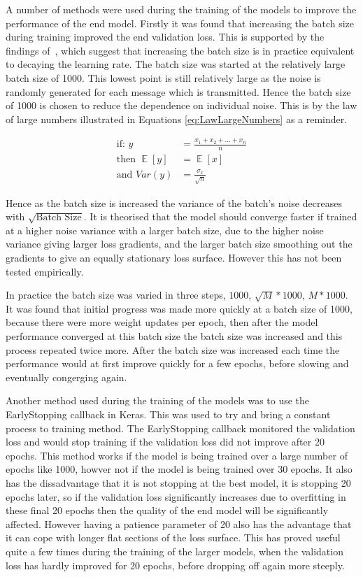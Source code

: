 \documentclass[12pt,onecolumn,letterpaper]{article}
\begin{document}
A number of methods were used during the training of the models to improve the performance of the end model. Firstly it was found that increasing the batch size during training improved the end validation loss. This is supported by the findings of~\cite{IncBatchSize}, which suggest that increasing the batch size is in practice equivalent to decaying the learning rate. The batch size was started at the relatively large batch size of 1000. This lowest point is still relatively large as the noise is randomly generated for each message which is transmitted. Hence the batch size of 1000 is chosen to reduce the dependence on individual noise. This is by the law of large numbers illustrated in Equations \ref{eq:LawLargeNumbers} as a reminder.

\begin{align}
   \mbox{if: } y &= \frac{x_1 + x_2 +\dots + x_n}{n} \nonumber\\
   \mbox{then }  \mathop{\mathbb{E}}[y] &= \mathop{\mathbb{E}}[x] \nonumber\\
   \mbox{and } Var(y) &= \frac{\sigma_x}{\sqrt{n}}
   \label{eq:LawLargeNumbers}
\end{align}

Hence as the batch size is increased the variance of the batch's noise decreases with $\sqrt{\mbox{Batch Size}}$. It is theorised that the model should converge faster if trained at a higher noise variance with a larger batch size, due to the higher noise variance giving larger loss gradients, and the larger batch size smoothing out the gradients to give an equally stationary loss surface. However this has not been tested empirically.

In practice the batch size was varied in three steps, $1000$, $\sqrt{M}*1000$, $M*1000$. It was found that initial progress was made more quickly at a batch size of 1000, because there were more weight updates per epoch, then after the model performance converged at this batch size the batch size was increased and this process repeated twice more. After the batch size was increased each time the performance would at first improve quickly for a few epochs, before slowing and eventually congerging again.

Another method used during the training of the models was to use the EarlyStopping callback in Keras. This was used to try and bring a constant process to training method. The EarlyStopping callback monitored the validation loss and would stop training if the validation loss did not improve after 20 epochs. This method works if the model is being trained over a large number of epochs like 1000, howver not if the model is being trained over 30 epochs. It also has the dissadvantage that it is not stopping at the best model, it is stopping 20 epochs later, so if the validation loss significantly increases due to overfitting in these final 20 epochs then the quality of the end model will be significantly affected. However having a patience parameter of 20 also has the advantage that it can cope with longer flat sections of the loss surface. This has proved useful quite a few times during the training of the larger models, when the validation loss has hardly improved for 20 epochs, before dropping off again more steeply. 
\end{document}
